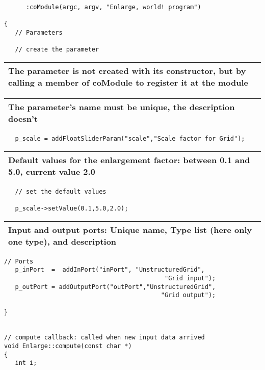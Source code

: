 \begin{verbatim}  
      :coModule(argc, argv, "Enlarge, world! program")
          
{    
   // Parameters
   
   // create the parameter
\end{verbatim}

\begin{longtable}{|p{12cm}|}
\hline
   {\bf The parameter is not created with its constructor, but by calling a member
   of coModule to register it at the module} \\
\hline
\end{longtable}

\begin{longtable}{|l|}
\hline
   {\bf The parameter's name must be unique, the description doesn't} \\
\hline
\end{longtable}

\begin{verbatim}       
   p_scale = addFloatSliderParam("scale","Scale factor for Grid");
\end{verbatim}

\begin{longtable}{|l|}
\hline
   {\bf Default values for the enlargement factor: between 0.1 and 5.0, current
   value 2.0} \\
\hline
\end{longtable}

\begin{verbatim}                                                               
   // set the default values
      
   p_scale->setValue(0.1,5.0,2.0);
\end{verbatim}

\begin{longtable}{|l|}
\hline
   {\bf Input and output ports: Unique name, Type list (here only one type), and
   description} \\
\hline
\end{longtable}
   
\begin{verbatim}
// Ports
   p_inPort  =  addInPort("inPort", "UnstructuredGrid",
                                            "Grid input");
   p_outPort = addOutputPort("outPort","UnstructuredGrid",
                                           "Grid output");
 					   
}   


// compute callback: called when new input data arrived
void Enlarge::compute(const char *) 
{ 
   int i;
\end{verbatim}

